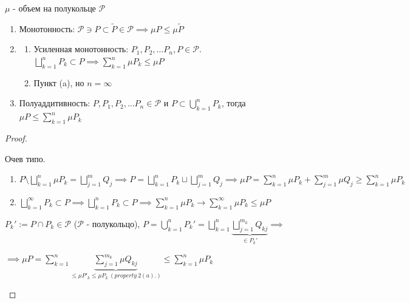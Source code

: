 \begin{theorem}
    $\mu$ - объем на полукольце $\mathcal{P}$

    \begin{enumerate}
        \item Монотонность: $\mathcal{P} \ni P \subset \tilde{P} \in \mathcal{P} \implies \mu P \leq \mu \tilde{P}$
        \item {
            \begin{enumerate}
                \item Усиленная монотонность: $P_1, P_2, \dots P_n, P \in \mathcal{P}$. $\bigsqcup_{k=1}^n P_k \subset P \implies \sum_{k=1}^n \mu P_k \leq \mu P$
                \item Пункт (a), но $n = \infty$
            \end{enumerate}
        }
        \item Полуаддитивность: $P, P_1, P_2, \dots P_n \in \mathcal{P}$ и $P \subset \bigcup_{k=1}^{n}P_k$, тогда $\mu P \leq \sum_{k=1}^{n} \mu P_k$ 
    \end{enumerate}
\end{theorem}

\begin{proof}
    \begin{enumerate}
        \item Очев типо.
        \item {
        \begin{enumerate}
            \item $P \setminus \bigsqcup_{k=1}^{n} \mu P_k =  \bigsqcup_{j=1}^{m} Q_j \implies P = \bigsqcup_{k=1}^{n} P_k \sqcup \bigsqcup_{j=1}^m Q_j \implies \mu P = \sum_{k=1}^{n} \mu P_k + \sum_{j=1}^{m} \mu Q_j \geq \sum_{k=1}^{n} \mu P_k $
            \item $\bigsqcup_{k=1}^{\infty} P_k \subset P \implies \bigsqcup_{k=1}^n P_k \subset P \implies \sum_{k=1}^{n} \mu P_k \rightarrow \sum_{k=1}^{\infty} \mu P_k \leq \mu P$
        \end{enumerate}
        \item {
            $P_k' := P \cap P_k \in \mathcal{P}$ ($\mathcal{P}$ - полукольцо), \;\; $P = \bigcup_{k=1}^{n} P_k' = \bigsqcup_{k=1}^{n} \underbrace{\bigsqcup_{j=1}^{m_k} Q_{kj}}_{\in P_k'} \implies$
            
            $\implies \mu P = \sum_{k=1}^n \underbrace{\sum_{j=1}^{m_k} \mu Q_{kj}}_{\leq \mu P'_k \leq \mu P_k \ (property \ 2(a). )} \leq \sum_{k=1}^n \mu P_k$
        }
        }
    \end{enumerate}
\end{proof}

